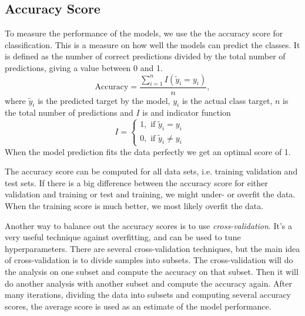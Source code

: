 \documentclass[a4paper, american, 12pt]{report}
\begin{document}
	\subsection{Accuracy Score}
	\label{subsect:Theory-Accuracy}
	To measure the performance of the models, we use the the accuracy score for classification. This is a measure on how well the models can predict the classes. It is defined as the number of correct predictions divided by the total number of predictions, giving a value between 0 and 1. 
	\begin{equation}
	\label{eq:AccuracyScore}
		\text{Accuracy}=\frac{\sum_{i=1}^nI(\tilde{y}_i=y_i)}{n},
	\end{equation}
	where $\tilde{y}_i$ is the predicted target by the model, $y_i$ is the actual class target, $n$ is the total number of predictions and $I$ is and indicator function
	\begin{equation}
	\label{eq:IndicatorFunc}
		I = \begin{cases*}
			1, \text{ if $\tilde{y}_i=y_i$ }\\
			0, \text{ if $\tilde{y}_i\neq y_i$}
			\end{cases*}
	\end{equation}
	When the model prediction fits the data perfectly we get an optimal score of 1. 
	
	The accuracy score can be computed for all data sets, i.e. training validation and test sets. If there is a big difference between the accuracy score for either validation and training or test and training, we might under- or overfit the data. When the training score is much better, we most likely overfit the data.
	
	Another way to balance out the accuracy scores is to use \textit{cross-validation}. It's a very useful technique against overfitting, and can be used to tune hyperparameters. There are several cross-validation techniques, but the main idea of cross-validation is to divide samples into subsets. The cross-validation will do the analysis on one subset and compute the accuracy on that subset. Then it will do another analysis with another subset and compute the accuracy again. After many iterations, dividing the data into subsets and computing several accuracy scores, the average score is used as an estimate of the model performance. 
	
	
\end{document}
